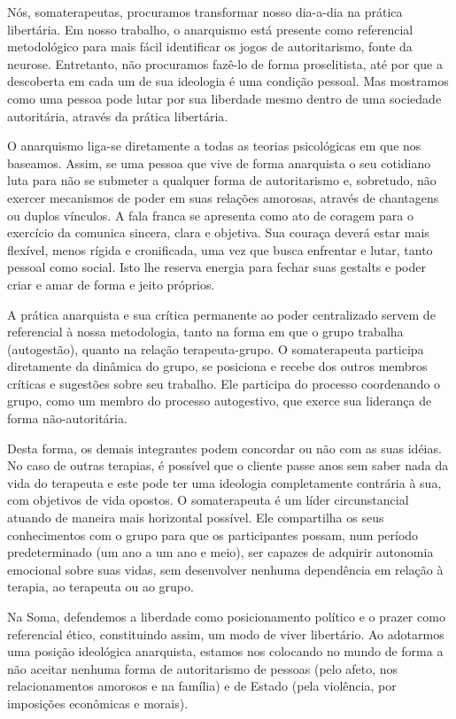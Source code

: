 Nós, somaterapeutas, procuramos transformar nosso dia-a-dia na prática
libertária. Em nosso trabalho, o anarquismo está presente como
referencial metodológico para mais fácil identificar os jogos de
autoritarismo, fonte da neurose. Entretanto, não procuramos fazê-lo de
forma proselitista, até por que a descoberta em cada um de sua ideologia
é uma condição pessoal. Mas mostramos como uma pessoa pode lutar por sua
liberdade mesmo dentro de uma sociedade autoritária, através da prática
libertária.

O anarquismo liga-se diretamente a todas as teorias psicológicas em que
nos baseamos. Assim, se uma pessoa que vive de forma anarquista o seu
cotidiano luta para não se submeter a qualquer forma de autoritarismo e,
sobretudo, não exercer mecanismos de poder em suas relações amorosas,
através de chantagens ou duplos vínculos. A fala franca se apresenta
como ato de coragem para o exercício da comunica sincera, clara e
objetiva. Sua couraça deverá estar mais flexível, menos rígida e
cronificada, uma vez que busca enfrentar e lutar, tanto pessoal como
social. Isto lhe reserva energia para fechar suas gestalts e poder criar
e amar de forma e jeito próprios.

A prática anarquista e sua crítica permanente ao poder centralizado
servem de referencial à nossa metodologia, tanto na forma em que o grupo
trabalha (autogestão), quanto na relação terapeuta-grupo. O
somaterapeuta participa diretamente da dinâmica do grupo, se posiciona e
recebe dos outros membros críticas e sugestões sobre seu trabalho. Ele
participa do processo coordenando o grupo, como um membro do processo
autogestivo, que exerce sua liderança de forma não-autoritária.

Desta forma, os demais integrantes podem concordar ou não com as suas
idéias. No caso de outras terapias, é possível que o cliente passe anos
sem saber nada da vida do terapeuta e este pode ter uma ideologia
completamente contrária à sua, com objetivos de vida opostos. O
somaterapeuta é um líder circunstancial atuando de maneira mais
horizontal possível. Ele compartilha os seus conhecimentos com o grupo
para que os participantes possam, num período predeterminado (um ano a
um ano e meio), ser capazes de adquirir autonomia emocional sobre suas
vidas, sem desenvolver nenhuma dependência em relação à terapia, ao
terapeuta ou ao grupo.

Na Soma, defendemos a liberdade como posicionamento político e o prazer
como referencial ético, constituindo assim, um modo de viver libertário.
Ao adotarmos uma posição ideológica anarquista, estamos nos colocando no
mundo de forma a não aceitar nenhuma forma de autoritarismo de pessoas
(pelo afeto, nos relacionamentos amorosos e na família) e de Estado
(pela violência, por imposições econômicas e morais).

